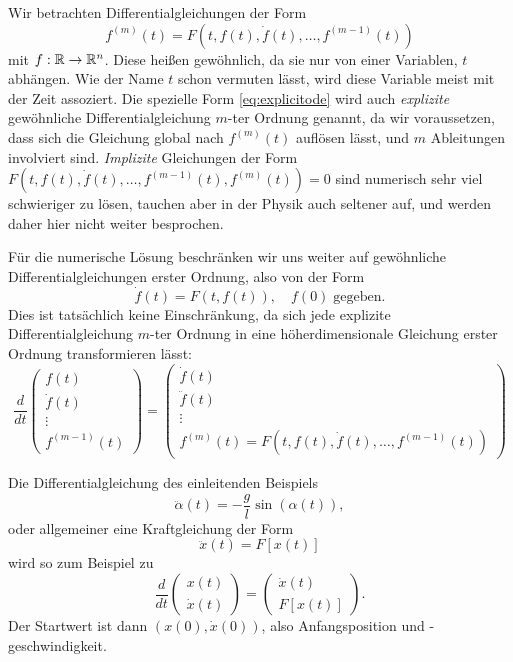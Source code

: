 Wir betrachten Differentialgleichungen der Form
\begin{equation}
  \label{eq:explicitode}
  f^{(m)}(t) = F(t, f(t), \dot f(t), \ldots, f^{(m-1)}(t))
\end{equation}
mit $f:\mathbb{R}\to\mathbb{R}^n$. Diese heißen gewöhnlich, da sie nur von einer
Variablen, $t$ abhängen. Wie der Name $t$ schon vermuten lässt, wird
diese Variable meist mit der Zeit assoziert. Die spezielle Form
\eqref{eq:explicitode} wird auch \emph{explizite} gewöhnliche
Differentialgleichung $m$-ter Ordnung genannt, da wir voraussetzen,
dass sich die Gleichung global nach $f^{(m)}(t)$ auflösen lässt, und
$m$ Ableitungen involviert sind. \emph{Implizite} Gleichungen der Form
$F(t, f(t), \dot f(t), \ldots, f^{(m-1)}(t),f^{(m)}(t)) = 0$ sind
numerisch sehr viel schwieriger zu lösen, tauchen aber in der Physik
auch seltener auf, und werden daher hier nicht weiter besprochen.

Für die numerische Lösung beschränken wir uns weiter auf gewöhnliche
Differentialgleichungen erster Ordnung, also von der Form
\begin{equation}
  \label{eq:1storderode}
  \dot f(t) = F(t, f(t)),\quad f(0)\;\text{gegeben}.
\end{equation}
Dies ist tatsächlich keine Einschränkung, da sich jede explizite
Differentialgleichung $m$-ter Ordnung in eine höherdimensionale
Gleichung erster Ordnung transformieren lässt:
\begin{equation}
  \frac{d}{dt}\begin{pmatrix}
    f(t)\\
    \dot f(t)\\
    \vdots\\
    f^{(m-1)}(t)
  \end{pmatrix}
  =
  \begin{pmatrix}
    \dot f(t)\\
    \ddot f(t)\\
    \vdots\\
    f^{(m)}(t) = F(t, f(t), \dot f(t), \ldots, f^{(m-1)}(t))
  \end{pmatrix}
\end{equation}

Die Differentialgleichung des einleitenden Beispiels
\begin{equation}
  \ddot \alpha(t) = -\frac{g}{l}\sin(\alpha(t)),
\end{equation}
oder allgemeiner eine Kraftgleichung der Form
\begin{equation}
  \ddot x(t) = F[x(t)]
\end{equation}
wird so zum Beispiel zu
\begin{equation}
  \label{eq:explicitode}
  \frac{d}{dt}\begin{pmatrix}
    x(t)\\
    \dot x(t)
  \end{pmatrix}
  =
  \begin{pmatrix}
    \dot x(t)\\
    F[x(t)]
  \end{pmatrix}.
\end{equation}  
Der Startwert ist dann $(x(0), \dot x(0))$, also Anfangsposition und
-geschwindigkeit.


